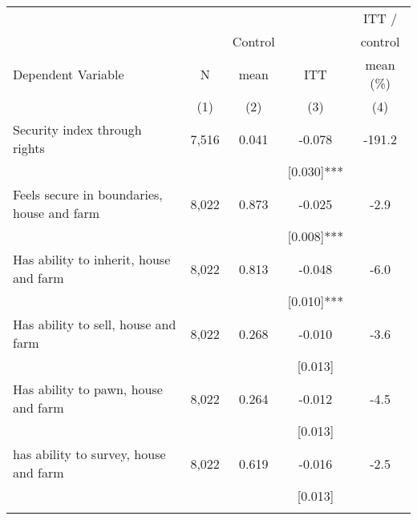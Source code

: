 \begin{tabular}{lcccc}
\hline \noalign{\smallskip} &  &  &  & ITT /\\
 &  & Control &  & control\\
Dependent Variable & N & mean & ITT & mean (\%)\\
 & (1) & (2) & (3) & (4)\\
\noalign{\smallskip}\hline \noalign{\smallskip}Security index through rights & 7,516 & 0.041 & -0.078 & -191.2\\
 &  &  & [0.030]*** & \\
\quad Feels secure in boundaries, house and farm & 8,022 & 0.873 & -0.025 & -2.9\\
 &  &  & [0.008]*** & \\
\quad Has ability to inherit, house and farm & 8,022 & 0.813 & -0.048 & -6.0\\
 &  &  & [0.010]*** & \\
\quad Has ability to sell, house and farm & 8,022 & 0.268 & -0.010 & -3.6\\
 &  &  & [0.013] & \\
\quad Has ability to pawn, house and farm & 8,022 & 0.264 & -0.012 & -4.5\\
 &  &  & [0.013] & \\
\quad has ability to survey, house and farm & 8,022 & 0.619 & -0.016 & -2.5\\
 &  &  & [0.013] & \\
\noalign{\smallskip}\hline\end{tabular}
